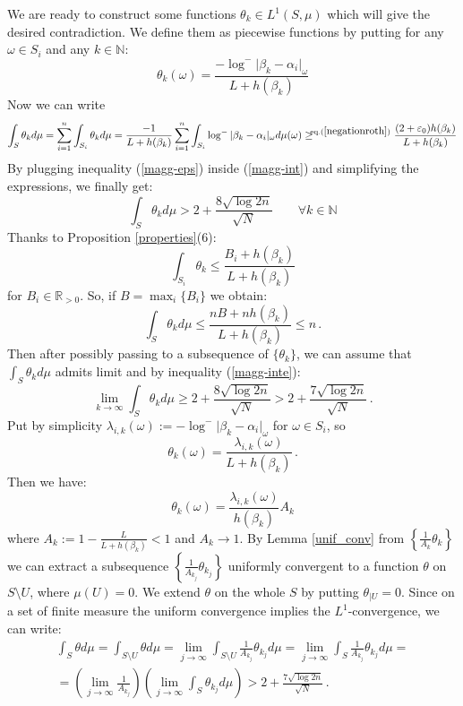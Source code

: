 \documentclass[10 pt,a4paper]{article}
\theoremstyle{plain}
\theoremstyle{definition}
\theoremstyle{named}
\begin{document}
We are ready to construct some functions  $\theta_k\in L^1(S,\mu)$ which will give the desired contradiction. We define them as  piecewise functions by putting for any $\omega\in  S_i$ and any $k\in\mathbb N$:
\[
\theta_k(\omega)=\frac{-\log^- \vert \beta_k-\alpha_i\vert_{\omega}}{L+h(\beta_k)}
\]
  Now we can write
\begin{equation}\label{magg-int}
\int_{S} \theta_k d\mu =\sum^n_{i=1}\int_{S_i} \theta_k d\mu=\frac{-1}{L+h(\beta_k)}\sum^n_{i=1}\int_{S_i}\log^- \vert \beta_k-\alpha_i\vert_{\omega} d\mu(\omega)\ge^{\!\!\textrm{eq.} (\ref{negationroth})}\frac{(2+\varepsilon_0)h(\beta_k)}{L+h(\beta_k)}
\end{equation}
By plugging inequality (\ref{magg-eps}) inside (\ref{magg-int}) and simplifying the expressions, we finally get:
\begin{equation}\label{magg-inte}
\int_{S}\theta_k d\mu >2+\frac{8\sqrt{\log 2n}}{\sqrt N} \qquad \forall k\in\mathbb N
\end{equation}
Thanks to Proposition \ref{properties}(6):
\[
\int_{S_i} \theta_k \le \frac{B_i+h(\beta_k)}{L+h(\beta_k)}
\]
for $B_i\in\mathbb R_{>0}$. So, if $B=\max_{i}\{B_i\}$ we obtain:
$$
\int_S\theta_k d\mu\le \frac{nB+nh(\beta_k)}{L+h(\beta_k)}\le n\,.
$$
Then after possibly passing to a subsequence of $\{\theta_k\}$, we can assume that $\int_{S}\theta_k d\mu$ admits limit and by inequality (\ref{magg-inte}):
\begin{equation}\label{key_in}
\lim_{k\to\infty }\int_{S}\theta_k d\mu\ge 2+\frac{8\sqrt{\log 2n}}{\sqrt N}>2+\frac{7\sqrt{\log 2n}}{\sqrt N}\,.
\end{equation}
Put by simplicity $\lambda_{i,k}(\omega):=-\log^- \vert \beta_k-\alpha_i\vert_{\omega}$ for $\omega\in S_i$, so 
$$\theta_k(\omega)=\frac{\lambda_{i,k}(\omega)}{L+h(\beta_k)}\,.$$
Then we have:
$$
\theta_k(\omega)=\frac{\lambda_{i,k}(\omega)}{h(\beta_k)}A_k
$$
where $A_k:=1-\frac{L}{L+h(\beta_k)}<1$ and $A_k\to 1$. By Lemma \ref{unif_conv} from $\left\{\frac{1}{A_k}\theta_k\right\}$ we can extract a subsequence  $\left\{\frac{1}{A_{k_j}}\theta_{k_j}\right\}$ uniformly convergent to a function $\theta$  on $S\setminus U$, where $\mu(U)=0$. We extend $\theta$ on the whole $S$ by putting $\theta_{|U}=0$. Since on a set of finite measure the uniform convergence implies the $L^1$-convergence, we can write:
\begin{equation}\label{final_contr}
    \begin{aligned}
\int_{S} \theta d\mu=\int_{S\setminus U} \theta d\mu=\lim_{j\to\infty}\int_{S\setminus U} \frac{1}{A_{k_j}}\theta_{k_j} d\mu=\lim_{j\to\infty}\int_{S} \frac{1}{A_{k_j}}\theta_{k_j} d\mu=\\
=\left(\lim_{j\to\infty}\frac{1}{A_{k_j}}\right)\left(\lim_{j\to\infty} \int_{S}\theta_{k_j} d\mu\right)> 2+\frac{7\sqrt{\log 2n}}{\sqrt N}\,.
\end{aligned}
\end{equation}
\end{document}
